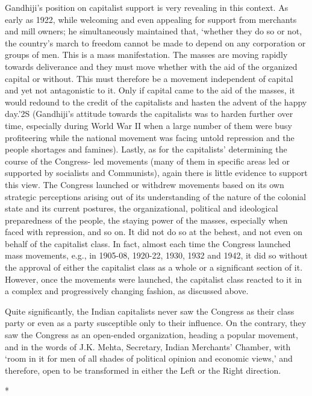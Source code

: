 Gandhiji’s position on capitalist support is very revealing in this context. As early as 1922, while welcoming and even appealing for support from merchants and mill owners; he simultaneously maintained that, ‘whether they do so or not, the country’s march to freedom cannot be made to depend on any corporation or groups of men. This is a mass manifestation. The masses are moving rapidly towards deliverance and they must move whether with the aid of the organized capital or without. This must therefore be a movement independent of capital and yet not antagonistic to it. Only if capital came to the aid of the masses, it would redound to the credit of the capitalists and hasten the advent of the happy day.’2S (Gandhiji’s attitude towards the capitalists was to harden further over time, especially during World War II when a large number of them were busy profiteering while the national movement was facing untold repression and the people shortages and famines). Lastly, as for the capitalists’ determining the course of the Congress- led movements (many of them in specific areas led or supported by socialists and Communists), again there is little evidence to support this view. The Congress launched or withdrew movements based on its own strategic perceptions arising out of its understanding of the nature of the colonial state and its current postures, the organizational, political and ideological preparedness of the people, the staying power of the masses, especially when faced with repression, and so on. It did not do so at the behest, and not even on behalf of the capitalist class. In fact, almost each time the Congress launched mass movements, e.g., in 1905-08, 1920-22, 1930, 1932 and 1942, it did so without the approval of either the capitalist class as a whole or a significant section of it. However, once the movements were launched, the capitalist class reacted to it in a complex and progressively changing fashion, as discussed above. 

Quite significantly, the Indian capitalists never saw the Congress as their class party or even as a party susceptible only to their influence. On the contrary, they saw the Congress as an open-ended organization, heading a popular movement, and in the words of J.K. Mehta, Secretary, Indian Merchants’ Chamber, with ‘room in it for men of all shades of political opinion and economic views,’ and therefore, open to be transformed in either the Left or the Right direction.

\begin{center}*\end{center}



